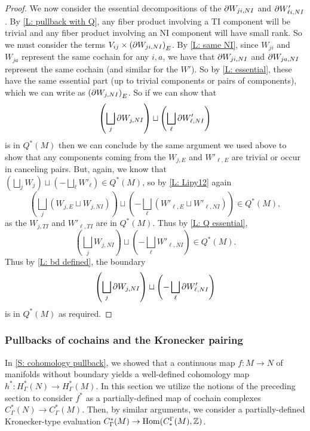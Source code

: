 \begin{proof}
We now consider the essential decompositions of the $\partial W_{ji,NI}$ and $\partial W'_{\ell i,NI}$. By \cref{L: pullback with Q}, any fiber product involving a TI component will be trivial and any fiber product involving an NI component will have small rank. So we must consider the terms $V_{ij} \times \left(\partial W_{ji,NI}\right)_E$. By \cref{L: same NI}, since $W_{ji}$ and $W_{ja}$ represent the same cochain for any $i,a$, we have that $\partial W_{ji,NI}$ and $\partial W_{ja,NI}$ represent the same cochain (and similar for the $W'$). So by \cref{L: essential}, these have the same essential part (up to trivial components or pairs of components), which we can write as $\left(\partial W_{j,NI}\right)_E$. So if we can show that
$$\left(\bigsqcup_j \partial W_{j,NI}\right) \sqcup \left(\bigsqcup_\ell \partial W'_{\ell,NI}\right)$$
is in $Q^*(M)$ then we can conclude by the same argument we used above to show that any components coming from the $W_{j,E}$ and $W'_{\ell,E}$ are trivial or occur in canceling pairs. But, again, we know that
 $(\bigsqcup_j W_{j}) \sqcup (-\bigsqcup_\ell W'_{\ell}) \in Q^*(M)$, so by \cref{L: Lipy12} again
$$\left(\bigsqcup_j \left(W_{j,E} \sqcup W_{j,NI}\right)\right) \sqcup \left(-\bigsqcup_\ell \left(W'_{\ell,E} \sqcup W'_{\ell,NI}\right)\right) \in Q^*(M),$$
as the $W_{j,TI}$ and $W'_{\ell, TI}$ are in $Q^*(M)$.
Thus by \cref{L: Q essential}, $$\left(\bigsqcup_j W_{j,NI}\right) \sqcup \left(-\bigsqcup_\ell W'_{\ell,NI}\right) \in Q^*(M).$$ Thus by \cref{L: bd defined}, the boundary
$$\left(\bigsqcup_j \partial W_{j,NI}\right) \sqcup \left(-\bigsqcup_\ell \partial W'_{\ell,NI}\right)$$ is in $Q^*(M)$
as required.
\end{proof}







\subsubsection{Pullbacks of cochains and the Kronecker pairing}

In \cref{S: cohomology pullback}, we showed that a continuous map $f \colon M \to N$ of manifolds without boundary yields a well-defined cohomology map $h^*:H^*_\Gamma(N) \to H^*_\Gamma(M)$. In this section we utilize the notions of the preceding section to consider $f^*$ as a partially-defined map of cochain complexes $C^*_\Gamma(N) \to C^*_\Gamma(M)$. Then, by similar arguments, we consider a partially-defined Kronecker-type evaluation $C^*_\Gamma(M) \to \textup{Hom}(C_*^\Gamma(M),\mathbb{Z})$.

